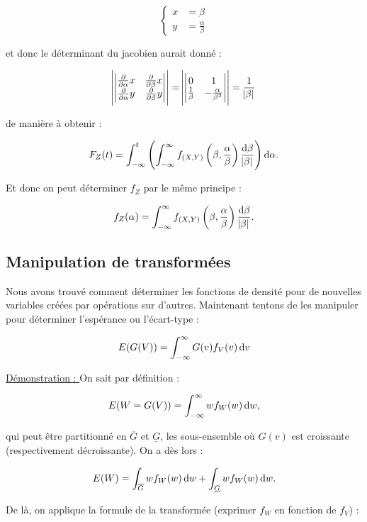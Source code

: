 \documentclass{article}
\renewcommand{\pd}[1]{\frac {\partial}{\partial #1}}
\begin{document}
			\[\left\{\begin{aligned}
				x &= \beta \\
				y &= \frac \alpha\beta
			\end{aligned}\right.\]

			et donc le déterminant du jacobien aurait donné :

			\[\abs{\begin{vmatrix}\pd \alpha x & \pd \beta x \\ \pd \alpha y & \pd \beta y\end{vmatrix}} =
			\abs{\begin{vmatrix}0 & 1 \\ \frac 1\beta & -\frac \alpha{\beta^2}\end{vmatrix}} =
			\frac 1{\abs\beta}\]

			de manière à obtenir :

			\[F_Z(t) = \int_{-\infty}^t\left(\int_{-\infty}^\infty f_{(X, Y)}\left(\beta, \frac \alpha\beta\right)\frac {\dif \beta}{\abs\beta}\right)\dif \alpha.\]

			Et donc on peut déterminer $f_Z$ par le même principe :

			\[f_Z(\alpha) = \int_{-\infty}^\infty f_{(X, Y)}\left(\beta, \frac \alpha\beta\right)\frac {\dif\beta}{\abs\beta}.\]

	\subsection{Manipulation de transformées}
		Nous avons trouvé comment déterminer les fonctions de densité pour de nouvelles variables créées par opérations sur d'autres. Maintenant tentons de les manipuler
		pour déterminer l'espérance ou l'écart-type :

		\begin{align}E(G(V)) = \int_{-\infty}^\infty G(v)f_V(v)\dif v\end{align}

		\underline{Démonstration : } On sait par définition :

		\[E(W=G(V)) = \int_{-\infty}^\infty wf_W(w)\dif w,\]

		qui peut être partitionné en $\overline G$ et $\underline G$, les sous-ensemble où $G(v)$ est croissante (respectivement décroissante). On a dès lors :

		\[E(W) = \int_{\overline G}wf_W(w)\dif w + \int_{\underline G}wf_W(w)\dif w.\]

		De là, on applique la formule de la transformée (exprimer $f_W$ en fonction de $f_V$) :
\end{document}
